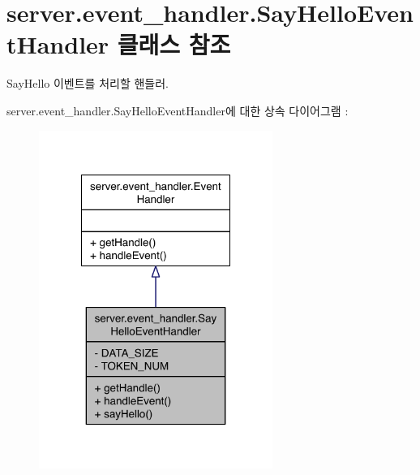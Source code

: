 \hypertarget{classserver_1_1event__handler_1_1_say_hello_event_handler}{\section{server.\-event\-\_\-handler.\-Say\-Hello\-Event\-Handler 클래스 참조}
\label{classserver_1_1event__handler_1_1_say_hello_event_handler}
}


Say\-Hello 이벤트를 처리할 핸들러.  




server.\-event\-\_\-handler.\-Say\-Hello\-Event\-Handler에 대한 상속 다이어그램 \-: \nopagebreak
\begin{figure}[H]
\begin{center}
\leavevmode
\includegraphics[width=216pt]{classserver_1_1event__handler_1_1_say_hello_event_handler__inherit__graph}
\end{center}
\end{figure}


